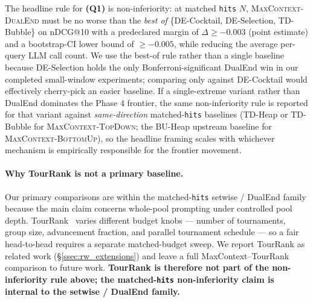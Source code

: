 The headline rule for \textbf{(Q1)} is non-inferiority: at matched
\texttt{hits} $N$, \textsc{MaxContext-DualEnd} must be no worse than the
\emph{best of} \{DE-Cocktail, DE-Selection, TD-Bubble\} on nDCG@10 with a
predeclared margin of $\Delta \geq -0.003$ (point estimate) and a
bootstrap-CI lower bound of $\geq -0.005$, while reducing the average
per-query LLM call count. We use the best-of rule rather than a single
baseline because DE-Selection holds the only Bonferroni-significant
DualEnd win in our completed small-window experiments; comparing only
against DE-Cocktail would effectively cherry-pick an easier baseline. If a
single-extreme variant rather than DualEnd dominates the Phase 4 frontier,
the same non-inferiority rule is reported for that variant against
\emph{same-direction} matched-\texttt{hits} baselines (TD-Heap or TD-Bubble
for \textsc{MaxContext-TopDown}; the BU-Heap upstream baseline for
\textsc{MaxContext-BottomUp}), so the headline framing scales with whichever
mechanism is empirically responsible for the frontier movement.

\paragraph{Why TourRank is not a primary baseline.}
Our primary comparisons are within the matched-\texttt{hits} setwise /
DualEnd family because the main claim concerns whole-pool prompting under
controlled pool depth. TourRank~\citep{chen2025tourrank} varies different
budget knobs --- number of tournaments, group size, advancement fraction,
and parallel tournament schedule --- so a fair head-to-head requires a
separate matched-budget sweep. We report TourRank as related work
(\S\ref{ssec:rw_extensions}) and leave a full MaxContext--TourRank
comparison to future work. \textbf{TourRank is therefore not part of the
non-inferiority rule above; the matched-\texttt{hits} non-inferiority claim
is internal to the setwise / DualEnd family.}

